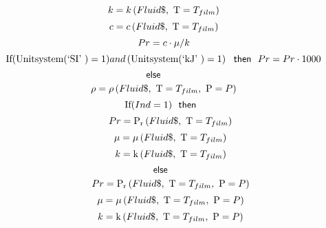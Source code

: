 \documentclass[10pt,fleqn]{article}
\newcommand{\F}[1]{\mbox{$#1$}}
\newcommand{\K}[1]{\mbox{\sf#1\ \ \mit}}
\newcommand{\KS}[1]{\mbox{\sf\ \ #1\ \ \mit}}
\newcommand{\SC}[1]{\mbox{`#1'}\  }
\newcommand{\V}[1]{\mbox{$ #1 $}}
\newcommand{\I}{\mbox{\hspace{0.20in}}}
\newcommand{\density}{\mathrm{\rho}}
\newcommand{\viscosity}{\mathrm{\mu}}
\newcommand{\conductivity}{\mathrm{k}}
\newcommand{\prandtl}{\mathrm{P_r}}
\begin{document}
\begin{equation}
\I \I \label{EES Eqn:40}
k=k\left( Fluid\$,\mbox{\ T}=T_{film} \right)  
\end{equation}
\begin{equation}
\I \I \label{EES Eqn:41}
c=c\left( Fluid\$,\mbox{\ T}=T_{film} \right)  
\end{equation}
\begin{equation}
\I \I \label{EES Eqn:42}
\V{Pr} =c\cdot \mu/k 
\end{equation}
\begin{equation}
\I \I \label{EES Eqn:43}
\mbox{If}{ \left( \mbox{Unitsystem}{ \left( \SC{SI} \right) }=1 \right) } \V{and}   \left( \mbox{Unitsystem}{ \left( \SC{kJ} \right) }=1 \right)  \KS{then} \V{Pr} =\V{Pr} \cdot 1000 
\end{equation}
\begin{equation}
\I \label{EES Eqn:44}
\K{else} 
\end{equation}
\begin{equation}
\I \I \label{EES Eqn:45}
\rho=\density \left(\F{Fluid}\$,\mbox{\ T}=T_{film},\mbox{\ P}=P \right)  
\end{equation}
\begin{equation}
\I \I \label{EES Eqn:46}
\mbox{If}{ \left( \V{Ind} =1 \right) } \KS{then} 
\end{equation}
\begin{equation}
\I \I \I \label{EES Eqn:47}
\V{Pr} =\prandtl \left(\F{Fluid}\$,\mbox{\ T}=T_{film} \right)  
\end{equation}
\begin{equation}
\I \I \I \label{EES Eqn:48}
\mu = \viscosity \left(\F{Fluid}\$,\mbox{\ T}=T_{film} \right)  
\end{equation}
\begin{equation}
\I \I \I \label{EES Eqn:49}
k = \conductivity \left(\F{Fluid}\$,\mbox{\ T}=T_{film} \right)  
\end{equation}
\begin{equation}
\I \I \label{EES Eqn:50}
\K{else} 
\end{equation}
\begin{equation}
\I \I \I \label{EES Eqn:51}
\V{Pr} =\prandtl \left(\F{Fluid}\$,\mbox{\ T}=T_{film},\mbox{\ P}=P \right) 	 
\end{equation}
\begin{equation}
\I \I \I \label{EES Eqn:52}
\mu = \viscosity \left(\F{Fluid}\$,\mbox{\ T}=T_{film},\mbox{\ P}=P \right) 	 
\end{equation}
\begin{equation}
\I \I \I \label{EES Eqn:53}
k = \conductivity \left(\F{Fluid}\$,\mbox{\ T}=T_{film},\mbox{\ P}=P \right)  
\end{equation}
\end{document}
